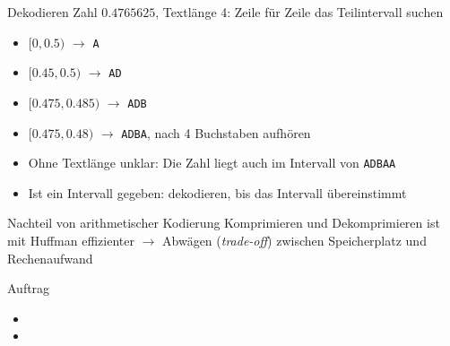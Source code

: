 \begin{frame}{Dekodieren}
Zahl $0.4765625$, Textlänge 4: Zeile für Zeile das Teilintervall suchen
\begin{itemize}[<+->]
\item $[0, 0.5)$ $\rightarrow$ \texttt{A}
\item $[0.45, 0.5)$ $\rightarrow$ \texttt{AD}
\item $[0.475, 0.485)$ $\rightarrow$ \texttt{ADB}
\item $[0.475, 0.48)$ $\rightarrow$ \texttt{ADBA}, nach 4 Buchstaben aufhören
\item Ohne Textlänge unklar: Die Zahl liegt auch im Intervall von \texttt{ADBAA}
\item Ist ein Intervall gegeben: dekodieren, bis das Intervall übereinstimmt
\end{itemize}
\end{frame}
\begin{frame}{Nachteil von arithmetischer Kodierung}
Komprimieren und Dekomprimieren ist mit Huffman effizienter $\rightarrow$ Abwägen (\textit{trade-off}) zwischen Speicherplatz und Rechenaufwand
\end{frame}
\begin{frame}[label=auftrag]{Auftrag}
	\begin{itemize}
		\item {}
		\item {}
	\end{itemize}
\end{frame}